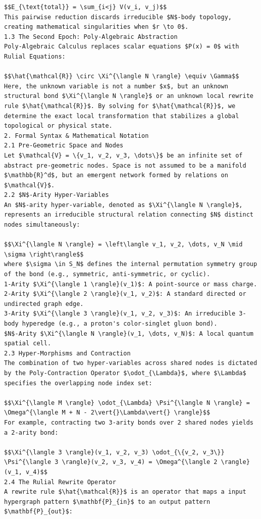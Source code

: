 \documentclass[11pt,a4paper]{article}
\begin{document}
\begin{lstlisting}[language={}, caption={}, basicstyle=\ttfamily\footnotesize, breaklines=true]
$$E_{\text{total}} = \sum_{i<j} V(v_i, v_j)$$
This pairwise reduction discards irreducible $N$-body topology, creating mathematical singularities when $r \to 0$.
1.3 The Second Epoch: Poly-Algebraic Abstraction
Poly-Algebraic Calculus replaces scalar equations $P(x) = 0$ with Rulial Equations:

$$\hat{\mathcal{R}} \circ \Xi^{\langle N \rangle} \equiv \Gamma$$
Here, the unknown variable is not a number $x$, but an unknown structural bond $\Xi^{\langle N \rangle}$ or an unknown local rewrite rule $\hat{\mathcal{R}}$. By solving for $\hat{\mathcal{R}}$, we determine the exact local transformation that stabilizes a global topological or physical state.
2. Formal Syntax & Mathematical Notation
2.1 Pre-Geometric Space and Nodes
Let $\mathcal{V} = \{v_1, v_2, v_3, \dots\}$ be an infinite set of abstract pre-geometric nodes. Space is not assumed to be a manifold $\mathbb{R}^d$, but an emergent network formed by relations on $\mathcal{V}$.
2.2 $N$-Arity Hyper-Variables
An $N$-arity hyper-variable, denoted as $\Xi^{\langle N \rangle}$, represents an irreducible structural relation connecting $N$ distinct nodes simultaneously:

$$\Xi^{\langle N \rangle} = \left\langle v_1, v_2, \dots, v_N \mid \sigma \right\rangle$$
where $\sigma \in S_N$ defines the internal permutation symmetry group of the bond (e.g., symmetric, anti-symmetric, or cyclic).
1-Arity $\Xi^{\langle 1 \rangle}(v_1)$: A point-source or mass charge.
2-Arity $\Xi^{\langle 2 \rangle}(v_1, v_2)$: A standard directed or undirected graph edge.
3-Arity $\Xi^{\langle 3 \rangle}(v_1, v_2, v_3)$: An irreducible 3-body hyperedge (e.g., a proton's color-singlet gluon bond).
$N$-Arity $\Xi^{\langle N \rangle}(v_1, \dots, v_N)$: A local quantum spatial cell.
2.3 Hyper-Morphisms and Contraction
The combination of two hyper-variables across shared nodes is dictated by the Poly-Contraction Operator $\odot_{\Lambda}$, where $\Lambda$ specifies the overlapping node index set:

$$\Xi^{\langle M \rangle} \odot_{\Lambda} \Psi^{\langle N \rangle} = \Omega^{\langle M + N - 2\vert{}\Lambda\vert{} \rangle}$$
For example, contracting two 3-arity bonds over 2 shared nodes yields a 2-arity bond:

$$\Xi^{\langle 3 \rangle}(v_1, v_2, v_3) \odot_{\{v_2, v_3\}} \Psi^{\langle 3 \rangle}(v_2, v_3, v_4) = \Omega^{\langle 2 \rangle}(v_1, v_4)$$
2.4 The Rulial Rewrite Operator
A rewrite rule $\hat{\mathcal{R}}$ is an operator that maps a input hypergraph pattern $\mathbf{P}_{in}$ to an output pattern $\mathbf{P}_{out}$:


\end{lstlisting}
\end{document}
